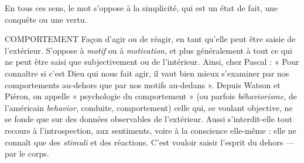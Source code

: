 En tous ces sens, le mot s’oppose à la simplicité, qui est un état de fait, une
conquête ou une vertu.

COMPORTEMENT Façon d’agir ou de réagir, en tant qu’elle peut être
saisie de l’extérieur. S’oppose à {\it motif} ou à {\it motivation},
et plus généralement à tout ce qui ne peut être saisi que subjectivement ou de
l’intérieur. Ainsi, chez Pascal : « Pour connaître si c’est Dieu qui nous fait agir,
il vaut bien mieux s’examiner par nos comportements au-dehors que par nos
motifs au-dedans ». Depuis Watson et Piéron, on appelle « psychologie du
comportement » (ou parfois {\it béhaviorisme}, de l'américain {\it behavior}, conduite,
comportement) celle qui, se voulant objective, ne se fonde que sur des données
observables de l'extérieur. Aussi s’interdit-elle tout recours à l’introspection,
aux sentiments, voire à la conscience elle-même : elle ne connaît que des {\it stimuli}
et des réactions. C’est vouloir saisir l’esprit du dehors — par le corps.

